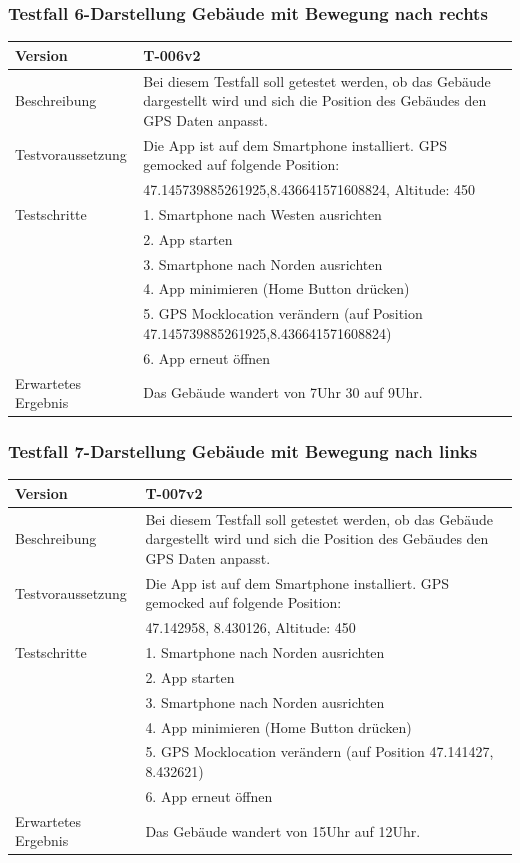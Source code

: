 \documentclass[a4paper]{scrreprt}
\begin{document}
\subsubsection{Testfall 6-Darstellung Gebäude mit Bewegung nach rechts}
\begin{tabularx}{\textwidth}{|l|X|}
\hline
	Version &
	T-006v2 \\
\hline
	Beschreibung &
	Bei diesem Testfall soll getestet werden, ob das Gebäude dargestellt wird und sich die Position des Gebäudes den GPS Daten anpasst. \\
\hline
	Testvoraussetzung &
	Die App ist auf dem Smartphone installiert. GPS gemocked auf folgende Position: \\ &
		47.145739885261925,8.436641571608824, Altitude: 450 \\ 
\hline 
	Testschritte & 
		1. Smartphone nach Westen ausrichten\\ &
		2. App starten\\ &
		3. Smartphone nach Norden ausrichten\\ &
		4. App minimieren (Home Button drücken)\\ &
		5. GPS Mocklocation verändern (auf Position 47.145739885261925,8.436641571608824)\\ &
		6. App erneut öffnen\\
\hline
	Erwartetes Ergebnis &
	Das Gebäude wandert von 7Uhr 30 auf 9Uhr.\\ 
\hline
\end{tabularx}
\subsubsection{Testfall 7-Darstellung Gebäude mit Bewegung nach links}
\begin{tabularx}{\textwidth}{|l|X|}
\hline
	Version &
	T-007v2 \\
\hline
	Beschreibung &
	Bei diesem Testfall soll getestet werden, ob das Gebäude dargestellt wird und sich die Position des Gebäudes den GPS Daten anpasst. \\
\hline
	Testvoraussetzung &
	Die App ist auf dem Smartphone installiert. GPS gemocked auf folgende Position: \\ &
		47.142958, 8.430126, Altitude: 450 \\ 
\hline 
	Testschritte & 
		1. Smartphone nach Norden ausrichten\\ &
		2. App starten\\ &
		3. Smartphone nach Norden ausrichten\\ &
		4. App minimieren (Home Button drücken)\\ &
		5. GPS Mocklocation verändern (auf Position  47.141427, 8.432621)\\ &
		6. App erneut öffnen\\
\hline
	Erwartetes Ergebnis &
	Das Gebäude wandert von 15Uhr auf 12Uhr. \\ 
\hline 
\end{tabularx}
\end{document}
